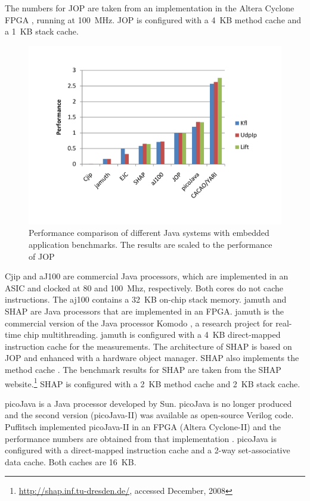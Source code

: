 The numbers for JOP are taken from an implementation in the Altera
Cyclone FPGA \cite{AltCyc}, running at 100~MHz. JOP is configured
with a 4~KB method cache and a 1~KB stack cache.

\begin{figure}[t]
    \centering
    \includegraphics[width=\excelwidth]{results/perf}
    \caption{Performance comparison of different Java systems with
    embedded application benchmarks. The results are scaled to the performance of JOP}
    \label{fig:bench}
\end{figure}

Cjip \cite{Cjip} and aJ100 \cite{aJile} are commercial Java
processors, which are implemented in an ASIC and clocked at 80 and
100~Mhz, respectively. Both cores do not cache instructions. The
aj100 contains a 32~KB on-chip stack memory. jamuth
\cite{jamuth:jtres07} and SHAP \cite{shap} are Java processors that
are implemented in an FPGA. jamuth is the commercial version of the
Java processor Komodo \cite{komodo2003}, a research project for
real-time chip multithreading. jamuth is configured with a 4~KB
direct-mapped instruction cache for the measurements. The
architecture of SHAP is based on JOP and enhanced with a hardware
object manager. SHAP also implements the method cache
\cite{shap:mcache}. The benchmark results for SHAP are taken from the
SHAP website.\footnote{\url{http://shap.inf.tu-dresden.de/}, accessed
December, 2008} SHAP is configured with a 2~KB method cache and 2~KB
stack cache.

picoJava \cite{pJ1} is a Java processor developed by Sun. picoJava is
no longer produced and the second version (picoJava-II) was available
as open-source Verilog code. Puffitsch implemented picoJava-II in an
FPGA (Altera Cyclone-II) and the performance numbers are obtained
from that implementation \cite{master:puffitsch}. picoJava is
configured with a direct-mapped instruction cache and a 2-way
set-associative data cache. Both caches are 16~KB.

